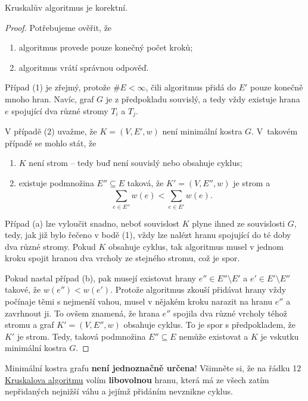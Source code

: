 \begin{claim}
 \label{claim:kruskal-korektni}
 Kruskalův algoritmus je korektní.
\end{claim}
\begin{proof}
 Potřebujeme ověřit, že
 \begin{enumerate}
  \item algoritmus provede pouze konečný počet kroků;
  \item algoritmus vrátí správnou odpověď.
 \end{enumerate}
 Případ (1) je zřejmý, protože $\# E < \infty$, čili algoritmus přidá do $E'$
 pouze konečně mnoho hran. Navíc, graf $G$ je z předpokladu souvislý, a tedy
 vždy existuje hrana $e$ spojující dva různé stromy $T_i$ a $T_j$.

 V případě (2) uvažme, že $K = (V,E',w)$ není minimální kostra $G$. V~takovém
 případě se mohlo stát, že
 \begin{enumerate}[label=(\alph*)]
  \item $K$ není strom -- tedy buď není souvislý nebo obsahuje cyklus;
  \item existuje podmnožina $E'' \subseteq E$ taková, že $K' = (V,E'',w)$ je strom a
   \[
    \sum_{e \in E''}^{} w(e) < \sum_{e \in E'}^{} w(e).
   \]
 \end{enumerate}
 Případ (a) lze vyloučit snadno, neboť souvislost $K$ plyne ihned ze
 souvislosti $G$, tedy, jak již bylo řečeno v bodě (1), vždy lze nalézt hranu
 spojující do té doby dva různé stromy. Pokud $K$ obsahuje cyklus, tak
 algoritmus musel v jednom kroku spojit hranou dva vrcholy ze stejného stromu,
 což je spor.

 Pokud nastal případ (b), pak musejí existovat hrany $e'' \in E'' \setminus E'$
 a $e' \in E' \setminus E''$ takové, že $w(e'') < w(e')$. Protože algoritmus
 zkouší přidávat hrany vždy počínaje těmi s nejmenší vahou, musel v nějakém
 kroku narazit na hranu $e''$ a zavrhnout ji. To ovšem znamená, že hrana $e''$ 
 spojila dva různé vrcholy téhož stromu a graf $K' = (V,E'',w)$ obsahuje
 cyklus. To je spor s předpokladem, že $K'$ je strom. Tedy, taková podmnožina
 $E'' \subseteq E$ nemůže existovat a $K$ je vskutku minimální kostra $G$.
\end{proof}

\begin{warning}
 Minimální kostra grafu \textbf{není jednoznačně určena}! Všimněte si, že na
 řádku 12 \hyperref[alg:kruskal]{Kruskalova algoritmu} volím
 \textbf{libovolnou} hranu, která má ze všech zatím nepřidaných nejnižší váhu a
 jejímž přidáním nevznikne cyklus.
\end{warning}

